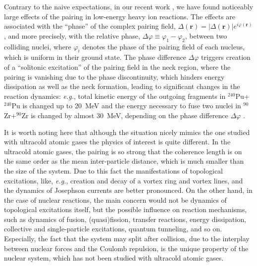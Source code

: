 \documentclass{PoS}
\def\bs#1{\boldsymbol{#1}}
\begin{document}
Contrary to the naive expectations, in our recent work \cite{soliton}, we have found
noticeably large effects of the pairing in low-energy heavy ion reactions. The effects
are associated with the ``phase'' of the complex pairing field, $\Delta(\bs{r})=
|\Delta(\bs{r})|e^{i\varphi(\bs{r})}$, and more precisely, with the
relative phase, $\Delta\varphi \equiv \varphi_1-\varphi_2$, between two colliding
nuclei, where $\varphi_i$ denotes the phase of the pairing field of each nucleus,
which is uniform in their ground state. The phase difference $\Delta\varphi$
triggers creation of a ``solitonic excitation'' of the pairing field in the neck region,
where the pairing is vanishing due to the phase discontinuity, which hinders energy
dissipation as well as the neck formation, leading to significant changes in the
reaction dynamics: \textit{e.g.}, total kinetic energy of the outgoing fragments in
$^{240}$Pu+$^{240}$Pu is changed up to 20~MeV and the energy necessary to fuse
two nuclei in $^{90}$Zr+$^{90}$Zr is changed by almost 30~MeV, depending on the
phase difference $\Delta\varphi$ \cite{soliton}.

It is worth noting here that although the situation nicely mimics the one studied
with ultracold atomic gases the physics of interest is quite different. In the ultracold
atomic gases, the pairing is so strong that the coherence length is on the same order
as the mean inter-particle distance, which is much smaller than the size of the system.
Due to this fact the manifestations of topological excitations, like, \textit{e.g.}, creation
and decay of a vortex ring and vortex lines, and the dynamics of Josephson currents
are better pronounced. On the other hand, in the case of nuclear reactions, the main
concern would not be dynamics of topological excitations itself, but the possible influence
on reaction mechanisms, such as dynamics of fusion, (quasi)fission, transfer reactions,
energy dissipation, collective and single-particle excitations, quantum tunneling, and so on.
Especially, the fact that the system may split after collision, due to the interplay
between nuclear forces and the Coulomb repulsion, is the unique property
of the nuclear system, which has not been studied with ultracold atomic gases.
\end{document}
